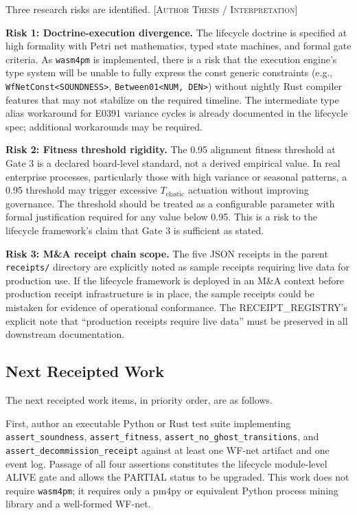 Three research risks are identified. [\textsc{Author Thesis / Interpretation}]

\textbf{Risk 1: Doctrine-execution divergence.} The lifecycle doctrine is specified
at high formality with Petri net mathematics, typed state machines, and formal gate
criteria. As \texttt{wasm4pm} is implemented, there is a risk that the execution
engine's type system will be unable to fully express the const generic constraints
(e.g., \texttt{WfNetConst<SOUNDNESS>}, \texttt{Between01<NUM, DEN>}) without nightly
Rust compiler features that may not stabilize on the required timeline. The intermediate
type alias workaround for E0391 variance cycles is already documented in the lifecycle
spec; additional workarounds may be required.

\textbf{Risk 2: Fitness threshold rigidity.} The 0.95 alignment fitness threshold at
Gate 3 is a declared board-level standard, not a derived empirical value. In real
enterprise processes, particularly those with high variance or seasonal patterns, a
0.95 threshold may trigger excessive $T_{\mathrm{elastic}}$ actuation without improving
governance. The threshold should be treated as a configurable parameter with formal
justification required for any value below 0.95. This is a risk to the lifecycle
framework's claim that Gate 3 is sufficient as stated.

\textbf{Risk 3: M\&A receipt chain scope.} The five JSON receipts in the parent
\texttt{receipts/} directory are explicitly noted as sample receipts requiring live
data for production use. If the lifecycle framework is deployed in an M\&A context
before production receipt infrastructure is in place, the sample receipts could be
mistaken for evidence of operational conformance. The RECEIPT\_REGISTRY's explicit
note that ``production receipts require live data'' must be preserved in all downstream
documentation.

\subsection{Next Receipted Work}
\label{sec:lifecycle-open-next}

The next receipted work items, in priority order, are as follows.

First, author an executable Python or Rust test suite implementing
\texttt{assert\_soundness}, \texttt{assert\_fitness}, \texttt{assert\_no\_ghost\_transitions},
and \texttt{assert\_decommission\_receipt} against at least one WF-net artifact and
one event log. Passage of all four assertions constitutes the lifecycle module-level
ALIVE gate and allows the PARTIAL status to be upgraded. This work does not require
\texttt{wasm4pm}; it requires only a pm4py or equivalent Python process mining library
and a well-formed WF-net.

